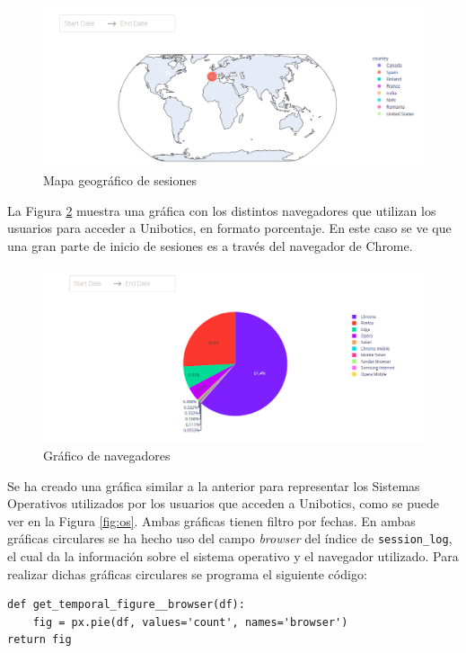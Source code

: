 \begin{figure}[H]
    \centering
    \includegraphics[width=17cm, keepaspectratio]{img/mundo.png}
    \caption{Mapa geográfico de sesiones}
    \label{fig:mundo}
\end{figure}

La Figura \ref{fig:browser} muestra una gráfica con los distintos navegadores que utilizan los usuarios para acceder a Unibotics, en formato porcentaje. En este caso se ve que una gran parte de inicio de sesiones es a través del navegador de Chrome. 


\begin{figure}[H]
    \centering
    \includegraphics[width=18cm, keepaspectratio]{img/browser.png}
    \caption{Gráfico de navegadores}
    \label{fig:browser}
\end{figure}
Se ha creado una gráfica similar a la anterior para representar los Sistemas Operativos utilizados por los usuarios que acceden a Unibotics, como se puede ver en la Figura \ref{fig:os}. Ambas gráficas tienen filtro por fechas. En ambas gráficas circulares se ha hecho uso del campo \textit{browser} del índice de \texttt{session\_log}, el cual da la información sobre el sistema operativo y el navegador utilizado. Para realizar dichas gráficas circulares se programa el siguiente código:
\begin{verbatim}
def get_temporal_figure__browser(df):
    fig = px.pie(df, values='count', names='browser')
return fig
\end{verbatim}

